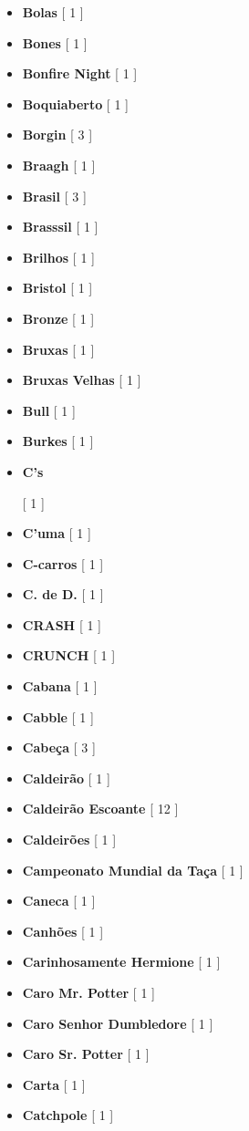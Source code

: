 \documentclass[a4paper]{article}
\begin{document}
\begin{itemize}
	\item \textbf{Bolas} [ 1 ]
	\item \textbf{Bones} [ 1 ]
	\item \textbf{Bonfire Night} [ 1 ]
	\item \textbf{Boquiaberto} [ 1 ]
	\item \textbf{Borgin} [ 3 ]
	\item \textbf{Braagh} [ 1 ]
	\item \textbf{Brasil} [ 3 ]
	\item \textbf{Brasssil} [ 1 ]
	\item \textbf{Brilhos} [ 1 ]
	\item \textbf{Bristol} [ 1 ]
	\item \textbf{Bronze} [ 1 ]
	\item \textbf{Bruxas} [ 1 ]
	\item \textbf{Bruxas Velhas} [ 1 ]
	\item \textbf{Bull} [ 1 ]
	\item \textbf{Burkes} [ 1 ]
	\item \hypertarget{C}{\textbf{C's}} [ 1 ]
	\item \textbf{C'uma} [ 1 ]
	\item \textbf{C-carros} [ 1 ]
	\item \textbf{C. de D.} [ 1 ]
	\item \textbf{CRASH} [ 1 ]
	\item \textbf{CRUNCH} [ 1 ]
	\item \textbf{Cabana} [ 1 ]
	\item \textbf{Cabble} [ 1 ]
	\item \textbf{Cabeça} [ 3 ]
	\item \textbf{Caldeirão} [ 1 ]
	\item \textbf{Caldeirão Escoante} [ 12 ]
	\item \textbf{Caldeirões} [ 1 ]
	\item \textbf{Campeonato Mundial da Taça} [ 1 ]
	\item \textbf{Caneca} [ 1 ]
	\item \textbf{Canhões} [ 1 ]
	\item \textbf{Carinhosamente Hermione} [ 1 ]
	\item \textbf{Caro Mr. Potter} [ 1 ]
	\item \textbf{Caro Senhor Dumbledore} [ 1 ]
	\item \textbf{Caro Sr. Potter} [ 1 ]
	\item \textbf{Carta} [ 1 ]
	\item \textbf{Catchpole} [ 1 ]

\end{itemize}
\end{document}
